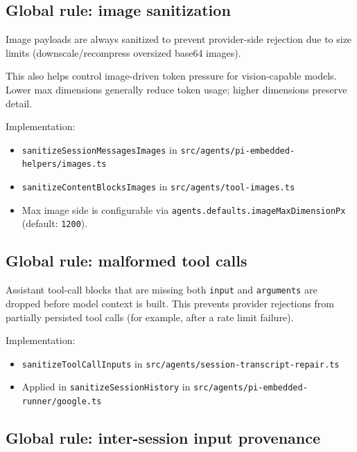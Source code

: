 \hrulefill


\subsection{Global rule: image sanitization}


Image payloads are always sanitized to prevent provider-side rejection due to size
limits (downscale/recompress oversized base64 images).

This also helps control image-driven token pressure for vision-capable models.
Lower max dimensions generally reduce token usage; higher dimensions preserve detail.

Implementation:

\begin{itemize}
  \item \texttt{sanitizeSessionMessagesImages} in \texttt{src/agents/pi-embedded-helpers/images.ts}
  \item \texttt{sanitizeContentBlocksImages} in \texttt{src/agents/tool-images.ts}
  \item Max image side is configurable via \texttt{agents.defaults.imageMaxDimensionPx} (default: \texttt{1200}).
\end{itemize}


\hrulefill


\subsection{Global rule: malformed tool calls}


Assistant tool-call blocks that are missing both \texttt{input} and \texttt{arguments} are dropped
before model context is built. This prevents provider rejections from partially
persisted tool calls (for example, after a rate limit failure).

Implementation:

\begin{itemize}
  \item \texttt{sanitizeToolCallInputs} in \texttt{src/agents/session-transcript-repair.ts}
  \item Applied in \texttt{sanitizeSessionHistory} in \texttt{src/agents/pi-embedded-runner/google.ts}
\end{itemize}


\hrulefill


\subsection{Global rule: inter-session input provenance}


